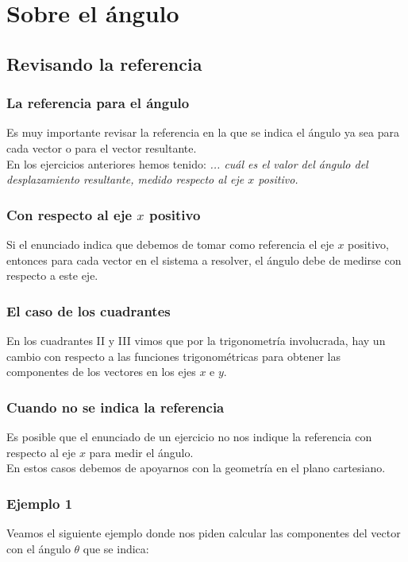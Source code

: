 \documentclass[12pt]{beamer}
\begin{document}
\section{Sobre el ángulo}
\subsection{Revisando la referencia}

\begin{frame}
\frametitle{La referencia para el ángulo}
Es muy importante revisar la referencia en la que se indica el ángulo ya sea para cada vector o para el vector resultante.
\\
\bigskip
\pause
En los ejercicios anteriores hemos tenido: \emph{... cuál es el valor del ángulo del desplazamiento resultante, medido respecto al eje $x$ positivo.}
\end{frame}
\begin{frame}
\frametitle{Con respecto al eje $x$ positivo}
Si el enunciado indica que debemos de tomar como referencia el eje $x$ positivo, entonces para cada vector en el sistema a resolver, el ángulo debe de medirse con respecto a este eje.
\end{frame}
\begin{frame}
\frametitle{El caso de los cuadrantes}
En los cuadrantes II y III vimos que por la trigonometría involucrada, hay un cambio con respecto a las funciones trigonométricas para obtener las componentes de los vectores en los ejes $x$ e $y$.
\end{frame}
\begin{frame}
\frametitle{Cuando no se indica la referencia}
Es posible que el enunciado de un ejercicio no nos indique la referencia con respecto al eje $x$ para medir el ángulo.
\\
\bigskip
\pause
En estos casos debemos de apoyarnos con la geometría en el plano cartesiano.
\end{frame}
\begin{frame}
\frametitle{Ejemplo 1}
Veamos el siguiente ejemplo donde nos piden calcular las componentes del vector con el ángulo $\theta$ que se indica:
\pause
\begin{figure}
\centering
{}
\end{figure}
\end{frame}
\end{document}
